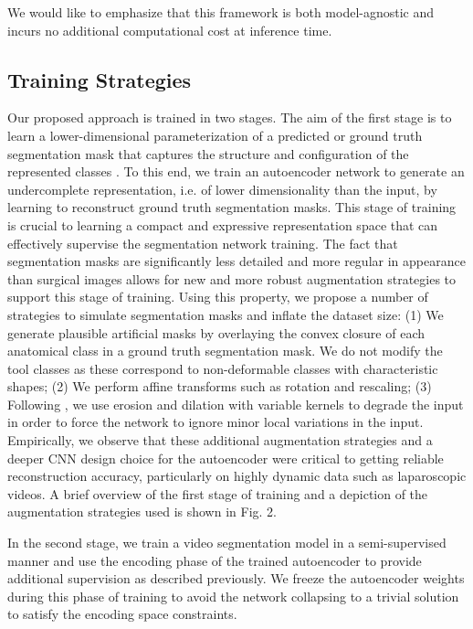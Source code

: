 \documentclass[twoside, print]{ieeecolor_arxiv}
\begin{document}
We would like to emphasize that this framework is both model-agnostic and incurs no additional computational cost at inference time.

\subsection{Training Strategies}
Our proposed approach is trained in two stages. The aim of the first stage is to learn a lower-dimensional parameterization of a predicted or ground truth segmentation mask that captures the structure and configuration of the represented classes \cite{acnn}\cite{vconv-dae}. To this end, we train an autoencoder network to generate an undercomplete representation, i.e. of lower dimensionality than the input, by learning to reconstruct ground truth segmentation masks. This stage of training is crucial to learning a compact and expressive representation space that can effectively supervise the segmentation network training. The fact that segmentation masks are significantly less detailed and more regular in appearance than surgical images allows for new and more robust augmentation strategies to support this stage of training. Using this property, we propose a number of strategies to simulate segmentation masks and inflate the dataset size: (1) We generate plausible artificial masks by overlaying the convex closure of each anatomical class in a ground truth segmentation mask. We do not modify the tool classes as these correspond to non-deformable classes with characteristic shapes; (2) We perform affine transforms such as rotation and rescaling; (3)  Following \cite{postdae1}, we use erosion and dilation with variable kernels to degrade the input in order to force the network to ignore minor local variations in the input. Empirically, we observe that these additional augmentation strategies and a deeper CNN design choice for the autoencoder were critical to getting reliable reconstruction accuracy, particularly on highly dynamic data such as laparoscopic videos. A brief overview of the first stage of training and a depiction of the augmentation strategies used is shown in Fig. 2.

In the second stage, we train a video segmentation model in a semi-supervised manner and use the encoding phase of the trained autoencoder to provide additional supervision as described previously. We freeze the autoencoder weights during this phase of training to avoid the network collapsing to a trivial solution to satisfy the encoding space constraints.
\end{document}
